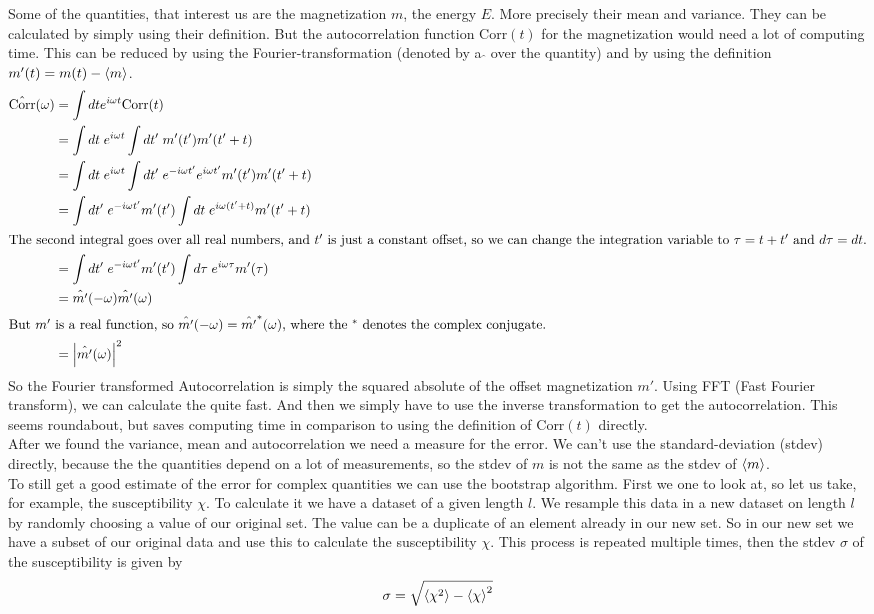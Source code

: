 Some of the quantities, that interest us are the magnetization $m$, the energy $E$. More precisely their mean and variance. They can be calculated by simply using their definition. But the autocorrelation function Corr$(t)$ for the magnetization would need a lot of computing time. This can be reduced by using the Fourier-transformation (denoted by a $\hat{}$ over the quantity) and by using the definition $m'(t) = m(t) - \left\langle m\right\rangle$.
\begin{align}
  \hat{\text{Corr}}(\omega) & = \int dt e^{i \omega t} \text{Corr}(t) \\
  & = \int dt \; e^{i \omega t} \int dt'\; m'(t') m'(t'+t) \\
  & = \int dt\; e^{i \omega t} \int dt'\; e^{-i \omega t'} e^{i \omega t'} m'(t') m'(t'+t) \\
  & = \int dt'\; e^{-i \omega t'} m'(t') \int dt\; e^{i \omega (t' + t)} m'(t'+t) \\
  \intertext{The second integral goes over all real numbers, and $t'$ is just a constant offset, so we can change the integration variable to $\tau = t + t'$ and $d \tau = dt$.}
  & = \int dt'\; e^{-i \omega t'} m'(t') \int d\tau \; e^{i \omega \tau} m'(\tau) \\
  & = \hat{m'}(- \omega) \hat{m'}(\omega) \\
  \intertext{But $m'$ is a real function, so $\hat{m'}(- \omega) = \hat{m'}^*( \omega)$, where the $^*$ denotes the complex conjugate.}
  & = \left\vert\hat{m'}(\omega) \right\vert^2
\end{align}
So the Fourier transformed Autocorrelation is simply the squared absolute of the offset magnetization $m'$. Using FFT (Fast Fourier transform), we can calculate the quite fast. And then we simply have to use the inverse transformation to get the autocorrelation. This seems roundabout, but saves computing time in comparison to using the definition of Corr$(t)$ directly.\\

After we found the variance, mean and autocorrelation we need a measure for the error. We can't use the standard-deviation (stdev) directly, because the the quantities depend on a lot of measurements, so the stdev of $m$ is not the same as the stdev of $\left\langle m\right\rangle$.\\
To still get a good estimate of the error for complex quantities we can use the bootstrap algorithm. First we one to look at, so let us take, for example, the susceptibility $\chi$. To calculate it we have a dataset of a given length $l$. We resample this data in a new dataset on length $l$ by randomly choosing a value of our original set. The value can be a duplicate of an element already in our new set. So in our new set we have a subset of our original data and use this to calculate the susceptibility $\chi$. This process is repeated multiple times, then the stdev $\sigma$ of the susceptibility is given by
\begin{equation}
  \sigma = \sqrt{\left\langle\chi^2\right\rangle - \left\langle\chi\right\rangle^2}
\end{equation}
